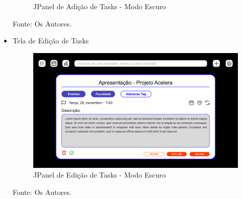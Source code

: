 \documentclass[a4paper,12pt]{article}
\begin{document}
\begin{itemize}
\begin{figure}[H]
		\caption{JPanel de Adição de Tasks - Modo Escuro}
	\end{figure}
	\noindent Fonte: Os Autores.
	\item Tela de Edição de Tasks
	\begin{figure}[H]
		\centering
		\includegraphics[scale=0.20]{prototypes/dark/Edit Task Panel Window.png}
		\caption{JPanel de Edição de Tasks - Modo Escuro}
	\end{figure}
	\noindent Fonte: Os Autores.
\end{itemize}
\end{document}
